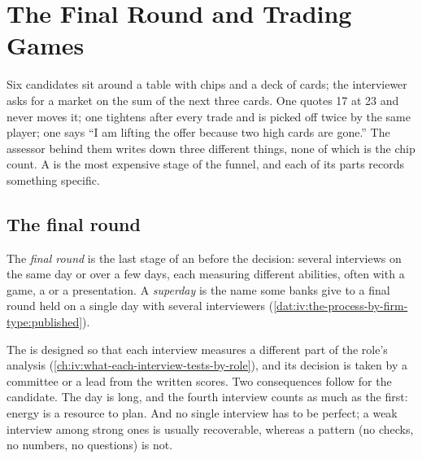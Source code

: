 \chapter{The Final Round and Trading Games}\label{ch:iv:the-final-round-and-trading-games}

Six candidates sit around a table with chips and a deck of cards; the interviewer asks for a market on the sum
of the next three cards. One quotes 17 at 23 and never moves it; one tightens after every trade and is picked
off twice by the same player; one says ``I am lifting the offer because two high cards are gone.'' The
assessor behind them writes down three different things, none of which is the chip count. A  is
the most expensive stage of the funnel, and each of its parts records something specific.

\section{The final round}

\begin{definition}\label{def:iv:the-final-round-and-trading-games:final}
The \emph{final round} is the last stage of an  before the decision: several
interviews on the same day or over a few days, each measuring different abilities, often with a game, a  or a presentation. A \emph{superday} is the name some banks give to a final round
held on a single day with several interviewers (\cref{dat:iv:the-process-by-firm-type:published}).
\end{definition}

The  is designed so that each interview measures a different part of the role's analysis
(\cref{ch:iv:what-each-interview-tests-by-role}), and its decision is taken by a committee or a lead from the
written scores. Two consequences follow for the candidate. The day is long, and the fourth interview counts as
much as the first: energy is a resource to plan. And no single interview has to be perfect; a weak interview
among strong ones is usually recoverable, whereas a pattern (no checks, no numbers, no questions) is not.

